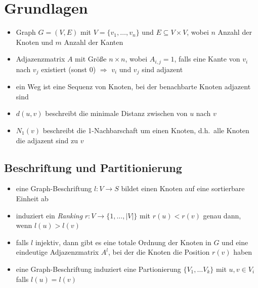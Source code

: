 \section{Grundlagen}

\begin{itemize}
  \item Graph $G = (V, E)$ mit $V = \lbrace v_1, \ldots, v_n \rbrace$ und $E \subseteq V \times V$, wobei $n$ Anzahl der Knoten und $m$ Anzahl der Kanten
  \item Adjazenzmatrix $A$ mit Größe $n \times n$, wobei $A_{i,j} = 1$, falls eine Kante von $v_i$ nach $v_j$ existiert (sonst $0$) $\Rightarrow$ $v_i$ und $v_j$ sind adjazent
  \item ein Weg ist eine Sequenz von Knoten, bei der benachbarte Knoten adjazent sind
  \item $d(u,v)$ beschreibt die minimale Distanz zwischen von $u$ nach $v$
  \item $N_1(v)$ beschreibt die 1-Nachbarschaft um einen Knoten, d.h.\ alle Knoten die adjazent sind zu $v$
\end{itemize}

\subsection{Beschriftung und Partitionierung}

\begin{itemize}
  \item eine Graph-Beschriftung $l: V \rightarrow S$ bildet einen Knoten auf eine sortierbare Einheit ab
  \item induziert ein \emph{Ranking} $r: V \rightarrow \lbrace 1, \ldots, |V| \rbrace$ mit $r(u) < r(v)$ genau dann, wenn $l(u) > l(v)$
  \item falls $l$ injektiv, dann gibt es eine totale Ordnung der Knoten in $G$ und eine eindeutige Adjazenzmatrix $A^l$, bei der die Knoten die Position $r(v)$ haben
  \item eine Graph-Beschriftung induziert eine Partionierung $\lbrace V_1, \ldots V_k \rbrace$ mit $u, v \in V_i$ falls $l(u) = l(v)$
\end{itemize}
